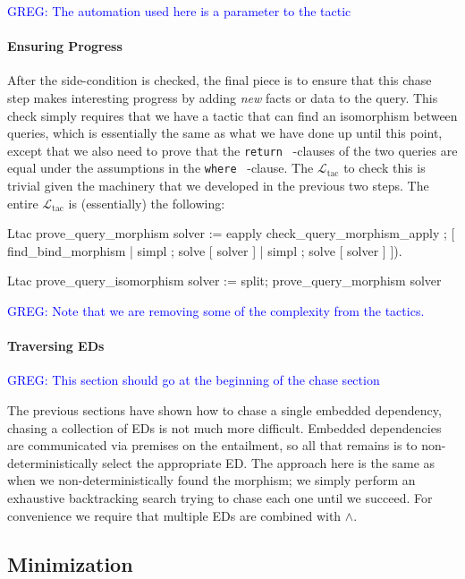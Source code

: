 \documentclass[preprint]{sigplanconf}
\newcommand{\WHERE}{{\tt where} \ }
\newcommand{\RETURN}{{\tt return} \ }
\newcommand{\greg}[1]{\textcolor{blue}{GREG: #1}}
\newcommand{\ltac}[0]{\ensuremath{\mathcal{L}_{\mathrm{tac}}}}
\begin{document}
\greg{The automation used here is a parameter to the tactic}

\paragraph{Ensuring Progress}
After the side-condition is checked, the final piece is to ensure that this chase step makes interesting progress by adding \emph{new} facts or data to the query.
This check simply requires that we have a tactic that can find an isomorphism between queries, which is essentially the same as what we have done up until this point, except that we also need to prove that the \RETURN-clauses of the two queries are equal under the assumptions in the \WHERE-clause.
The \ltac{} to check this is trivial given the machinery that we developed in the previous two steps.
The entire \ltac{} is (essentially) the following:
\begin{coq}
Ltac prove_query_morphism solver :=
  eapply check_query_morphism_apply ;
    [ find_bind_morphism
    | simpl ; solve [ solver ]
    | simpl ; solve [ solver ] ]).

Ltac prove_query_isomorphism solver :=
  split; prove_query_morphism solver
\end{coq}


\greg{Note that we are removing some of the complexity from the tactics.}


\paragraph{Traversing EDs}

\greg{This section should go at the beginning of the chase section}

The previous sections have shown how to chase a single embedded dependency, chasing a collection of EDs is not much more difficult.
Embedded dependencies are communicated via premises on the entailment, so all that remains is to non-deterministically select the appropriate ED.
The approach here is the same as when we non-deterministically found the morphism; we simply perform an exhaustive backtracking search trying to chase each one until we succeed.
For convenience we require that multiple EDs are combined with $\wedge$.

\subsection{Minimization}
\end{document}
